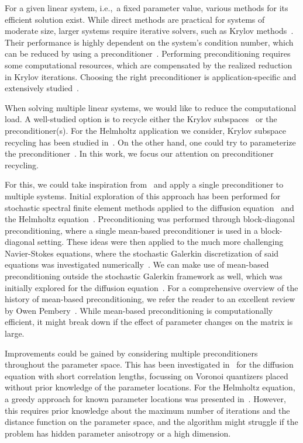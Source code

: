 For a given linear system, i.e.,\ a fixed parameter value, various methods for its efficient solution exist.
While direct methods are practical for systems of moderate size, larger systems require iterative solvers, such as Krylov methods~\cite{ipsen1998}.
Their performance is highly dependent on the system's condition number, which can be reduced by using a preconditioner~\cite{wathen2015}.
Performing preconditioning requires some computational resources, which are compensated by the realized reduction in Krylov iterations.
Choosing the right preconditioner is application-specific and extensively studied~\cite{pearson2020,wathen2015}.

When solving multiple linear systems, we would like to reduce the computational load.
A well-studied option is to recycle either the Krylov subspaces~\cite{parks2006} or the preconditioner(s).
For the Helmholtz application we consider, Krylov subspace recycling has been studied in~\cite{jin2009}.
On the other hand, one could try to parameterize the preconditioner~\cite{contreras2018}.
In this work, we focus our attention on preconditioner recycling.

For this, we could take inspiration from~\cite{graham2021} and apply a single preconditioner to multiple systems.
Initial exploration of this approach has been performed for stochastic spectral finite element methods applied to the diffusion equation~\cite{ghanem1996,keese2004,pellissetti2000} and the Helmholtz equation~\cite{wang2019,jin2009}.
Preconditioning was performed through block-diagonal preconditioning, where a single mean-based preconditioner is used in a block-diagonal setting.
These ideas were then applied to the much more challenging Navier-Stokes equations, where the stochastic Galerkin discretization of said equations was investigated numerically~\cite{powell2012}.
We can make use of mean-based preconditioning outside the stochastic Galerkin framework as well, which was initially explored for the diffusion equation~\cite{eiermann2007,ernst2009}.
For a comprehensive overview of the history of mean-based preconditioning, we refer the reader to an excellent review by Owen Pembery~\cite[Section~4.7]{pembery2020}.
While mean-based preconditioning is computationally efficient, it might break down if the effect of parameter changes on the matrix is large.

Improvements could be gained by considering multiple preconditioners throughout the parameter space.
This has been investigated in~\cite{venkovic2024} for the diffusion equation with short correlation lengths, focussing on Voronoi quantizers placed without prior knowledge of the parameter locations.
For the Helmholtz equation, a greedy approach for known parameter locations was presented in~\cite[Section~4.6]{pembery2020}.
However, this requires prior knowledge about the maximum number of iterations and the distance function on the parameter space, and the algorithm might struggle if the problem has hidden parameter anisotropy or a high dimension.

